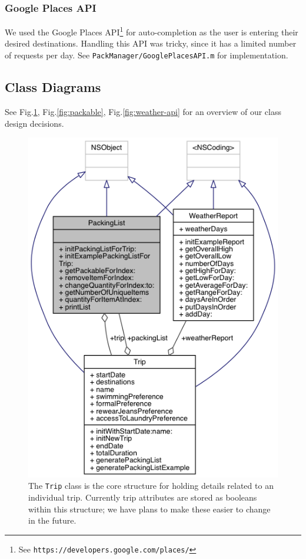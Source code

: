 \documentclass[11pt]{article}
\begin{document}
    \subsubsection{Google Places API}
    We used the Google Places API\footnote{See \texttt{https://developers.google.com/places/}} for auto-completion as the user is entering their desired destinations. Handling this API was tricky, since it has a limited number of requests per day. See \texttt{PackManager/GooglePlacesAPI.m} for implementation.


    \subsection{Class Diagrams}
    See Fig.\ref{fig:tripclass}, Fig.\ref{fig:packable}, Fig.\ref{fig:weather-api} for an overview of our class design decisions. 

    \begin{figure}
        \centering
        \includegraphics[scale=0.75]{img/trip_inheritance.png}
        \caption{The \texttt{Trip} class is the core structure for holding details related to an individual trip. Currently trip attributes are stored as booleans within this structure; we have plans to make these easier to change in the future.}
        \label{fig:tripclass}
    \end{figure}
\end{document}
